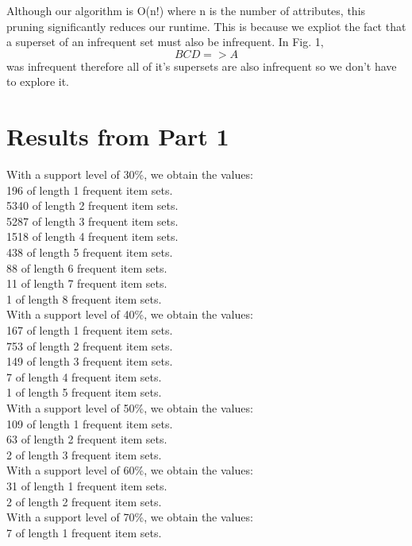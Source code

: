 \documentclass[12pt]{article}
\begin{document}
Although our algorithm is O(n!) where n is the number of attributes, this pruning significantly reduces our runtime. This is because we expliot the fact that a superset of an infrequent set must also be infrequent. In Fig. 1, $$BCD=>A$$ was infrequent therefore all of it's supersets are also infrequent so we don't have to explore it. 

\section*{Results from Part 1}
\noindent With a support level of 30\%, we obtain the values: \\
196 of length 1 frequent item sets. \\
5340 of length 2 frequent item sets. \\
5287 of length 3 frequent item sets. \\
1518 of length 4 frequent item sets.\\
438 of length 5 frequent item sets.\\
88 of length 6 frequent item sets.\\
11 of length 7 frequent item sets.\\
1 of length 8 frequent item sets.\\

\noindent With a support level of 40\%, we obtain the values: \\
167 of length 1 frequent item sets. \\
753 of length 2 frequent item sets. \\
149 of length 3 frequent item sets. \\
7 of length 4 frequent item sets.\\
1 of length 5 frequent item sets.\\

\noindent With a support level of 50\%, we obtain the values: \\
109 of length 1 frequent item sets. \\
63 of length 2 frequent item sets. \\
2 of length 3 frequent item sets. \\

\noindent With a support level of 60\%, we obtain the values: \\
31 of length 1 frequent item sets. \\
2 of length 2 frequent item sets. \\

\noindent With a support level of 70\%, we obtain the values: \\
7 of length 1 frequent item sets. \\
\end{document}
